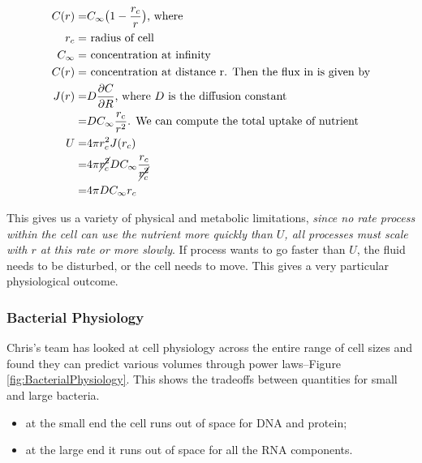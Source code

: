 \documentclass[]{article}
\begin{document}
\begin{align*}
	C(r) =& C_{\infty}\big(1 - \frac{r_c}{r}\big)\text{, where}\\
	r_c=& \text{ radius of cell}\\
	C_{\infty} =& \text{ concentration at infinity}\\
	C(r) =& \text{ concentration at distance r. Then the flux in is given by}\\
	J(r) =& D\frac{\partial C}{\partial R} \text{, where $D$ is the diffusion constant}\\
	  =& D C_{\infty} \frac{r_c}{r^2}\text{. We can compute the total uptake of nutrient}\\
	U =& 4 \pi r_c^2 J(r_c) \\
	=& 4 \pi\cancel{ r_c^2} D C_{\infty} \frac{r_c}{\cancel{r_c^2}}\\
	=&4 \pi D C_{\infty} r_c 
\end{align*}

This gives us a variety of physical and metabolic limitations, \emph{since no rate process within the cell can use the nutrient more quickly than $U$, all processes must scale with $r$ at this rate or more slowly}. If process wants to go faster than $U$, the fluid needs to be disturbed, or the cell needs to move. This gives a very particular physiological outcome.

\subsubsection{Bacterial Physiology}

Chris's  team has looked at cell physiology across the entire range of cell sizes and found they can predict various volumes through power laws--Figure \ref{fig:BacterialPhysiology}. This shows the tradeoffs between quantities for small and large bacteria.
\begin{itemize}
	\item at the small end the cell runs out of space for DNA and protein;
	\item at the large end it runs out of space for all the RNA components.
\end{itemize}
\end{document}
